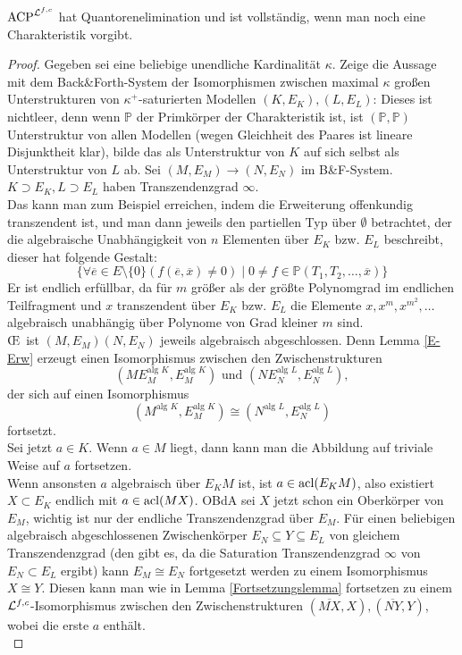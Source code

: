     \begin{theorem}\label{QE}
    	$\operatorname{ACP}^{\mathcal{L}^{f,c}}$ hat Quantorenelimination und ist vollständig, wenn man noch eine Charakteristik vorgibt.
    \end{theorem}
    \begin{proof}
    	Gegeben sei eine beliebige unendliche Kardinalität $\kappa$.
    	Zeige die Aussage mit dem Back\&Forth-System der Isomorphismen zwischen maximal $\kappa$ großen Unterstrukturen von $\kappa^+$-saturierten Modellen $(K,E_K),(L,E_L)$:
    	Dieses ist nichtleer, denn wenn $\mathbb{P}$ der Primkörper der Charakteristik ist, ist $(\mathbb{P},\mathbb{P})$ Unterstruktur von allen Modellen (wegen Gleichheit des Paares ist lineare Disjunktheit klar), bilde das als Unterstruktur von $K$ auf sich selbst als Unterstruktur von $L$ ab.
    	Sei $(M,E_M)\rightarrow(N,E_N)$ im B\&F-System. $K\supset E_K,L\supset E_L$ haben Transzendenzgrad $\infty$.\\
    	Das kann man zum Beispiel erreichen, indem die Erweiterung offenkundig transzendent ist, und man dann jeweils den partiellen Typ über $\emptyset$ betrachtet, der die algebraische Unabhängigkeit von $n$ Elementen über $E_K$ bzw. $E_L$ beschreibt, dieser hat folgende Gestalt:
    	$$\{\forall \overline{e}\in E\setminus\{0\}(f(\overline{e},\overline{x})\neq0)\mid 0\neq f\in\mathbb{P}(T_1,T_2,\dots,\overline{x})\}$$
    	Er ist endlich erfüllbar, da für $m$ größer als der größte Polynomgrad im endlichen Teilfragment und $x$ transzendent über $E_K$ bzw. $E_L$ die Elemente $x,x^m,x^{m^2},\dots$ algebraisch unabhängig über Polynome von Grad kleiner $m$ sind.\\
    	\OE\ ist $(M,E_M)(N,E_N)$ jeweils algebraisch abgeschlossen. Denn Lemma \ref{E-Erw} erzeugt einen Isomorphismus zwischen den Zwischenstrukturen $$(ME_M^{\text{alg }K},E_M^{\text{alg }K})\text{ und }(NE_N^{\text{alg }L},E_N^{\text{alg }L}),$$ der sich auf einen Isomorphismus $$(M^{\text{alg }K},E_M^{\text{alg }K})\cong(N^{\text{alg }L},E_N^{\text{alg }L})$$ fortsetzt.\\
    	Sei jetzt $a\in K$. Wenn $a\in M$ liegt, dann kann man die Abbildung auf triviale Weise auf $a$ fortsetzen.\\
    	Wenn ansonsten $a$ algebraisch über $E_KM$ ist, ist $a\in\operatorname{acl}(E_KM)$, also existiert $X\subset E_K$ endlich mit $a\in\operatorname{acl}(MX)$. OBdA sei $X$ jetzt schon ein Oberkörper von $E_M$, wichtig ist nur der endliche Transzendenzgrad über $E_M$. Für einen beliebigen algebraisch abgeschlossenen Zwischenkörper $E_N\subseteq Y\subseteq E_L$ von gleichem Transzendenzgrad (den gibt es, da die Saturation Transzendenzgrad $\infty$ von $E_N\subset E_L$ ergibt) kann $E_M\cong E_N$ fortgesetzt werden zu einem Isomorphismus $X\cong Y$. Diesen kann man wie in Lemma \ref{Fortsetzungslemma} fortsetzen zu einem $\mathcal{L}^{f,c}$-Isomorphismus zwischen den Zwischenstrukturen $(\overline{MX},X),(\overline{NY},Y)$, wobei die erste $a$ enthält.\\

\end{proof}
